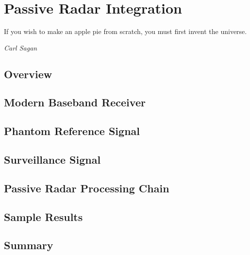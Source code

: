\documentclass[class=report,11pt,crop=false]{standalone}
\begin{document}
\chapter{Passive Radar Integration}
\epigraph{If you wish to make an apple pie from scratch, you must first invent the universe.}%
    {\emph{Carl Sagan}}

\section{Overview}

\blindmathpaper

\section{Modern Baseband Receiver}
\blindmathpaper

\section{Phantom Reference Signal}
\blindmathpaper

\section{Surveillance Signal}
\blindmathpaper

\section{Passive Radar Processing Chain}
\blindmathpaper

\section{Sample Results}
\blindmathpaper


\section{Summary}








\ifstandalone

\printnoidxglossary[type=\acronymtype,nonumberlist]
\fi
\end{document}
